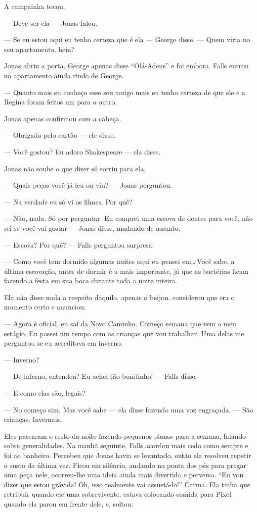 A campainha tocou.

--- Deve ser ela --- Jonas falou.

--- Se eu estou aqui eu tenho certeza que é ela --- George disse. --- Quem  viria no seu apartamento, hein?

Jonas abriu a porta. George apenas disse ``Olá-Adeus'' e foi embora. Falls entrou no apartamento ainda rindo de George.

--- Quanto mais eu conheço esse seu amigo\mudanca{,} mais eu tenho certeza de que ele e a Regina foram feitos um para o outro.

Jonas apenas confirmou com a cabeça.

--- Obrigado pelo cartão --- ele disse.

--- Você gostou? Eu adoro Shakespeare --- ela disse.

Jonas não soube o que dizer\mudanca{;} só sorriu para ela.

--- Quais peças você já leu ou viu? --- Jonas perguntou.

--- Na verdade eu só vi os filmes. Por quê?

--- Não, nada. Só por perguntar. Eu comprei uma escova de dentes para você, não sei se você vai gostar --- Jonas disse, mudando de assunto.

--- Escova? Por quê? --- Falls perguntou surpresa.

--- Como você tem dormido algumas noites aqui eu pensei em\ldots\,Você sabe, a última escovação, antes de dormir\mudanca{,} é a mais importante, já que as bactérias ficam fazendo a festa em sua boca durante toda a noite inteira.

Ela não disse nada a respeito daquilo, apenas o beijou.  considerou que era o momento certo\mudanca{,} e anunciou:

--- Agora é oficial, eu saí da Novo Caminho. Começo semana que vem o meu estágio. Eu passei um tempo com as crianças que vou trabalhar. Uma delas me perguntou se eu acreditava em inverno.

--- Inverno?

--- De inferno, entendeu? Eu achei tão bonitinho! --- Falls disse.

--- E como elas são, legais?

--- No começo sim. Mas\mudanca{,} você sabe --- ela disse\mudanca{,} fazendo uma voz engraçada. --- São crianças. Invernais.

Eles passaram o resto da noite fazendo pequenos planos para a semana, falando sobre generalidades. Na manhã seguinte, Falls acordou mais cedo\mudanca{,} como sempre\mudanca{,} e foi ao banheiro. Percebeu que Jonas havia se levantado, então ela resolveu repetir o susto da última vez. Ficou em silêncio, andando na ponta dos pés para pregar uma peça nele,  ocorreu-lhe uma ideia ainda mais divertida e perversa. ``Eu vou dizer que estou grávida! Oh, isso realmente vai assustá-lo!'' Carma. Ela tinha que retribuir quando ele  uma sobrevivente.  estava colocando comida para Pixel\mudanca{,} quando ela parou em frente dele, e, soltou:

